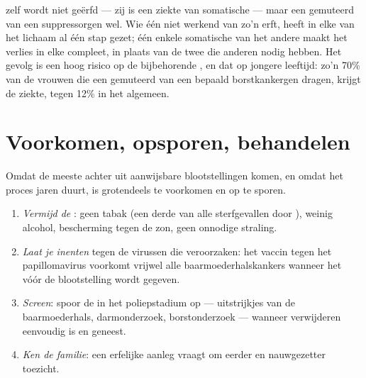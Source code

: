 \begin{proposition}\label{prop:g11:cancer:inherited}
 zelf wordt niet geërfd --- zij is een ziekte van somatische
 --- maar een gemuteerd  van een suppressorgen wel. Wie één
niet werkend  van zo'n  erft, heeft in elke  van het lichaam
al één stap gezet; één enkele somatische  van het andere 
maakt het verlies in elke  compleet, in plaats van de twee die anderen
nodig hebben. Het gevolg is een hoog risico op de bijbehorende , en
dat op jongere leeftijd: zo'n 70\% van de vrouwen die een gemuteerd 
van een bepaald borstkankergen dragen, krijgt de ziekte, tegen 12\% in het
algemeen.
\end{proposition}
\admitted

\section{Voorkomen, opsporen, behandelen}

\begin{method}\label{met:g11:cancer:prevention}
Omdat de meeste  achter  uit aanwijsbare blootstellingen
komen, en omdat het proces jaren duurt, is  grotendeels te
voorkomen en op te sporen.
\begin{enumerate}
  \item \emph{Vermijd de }: geen tabak (een derde van alle
        sterfgevallen door ), weinig alcohol, bescherming tegen de
        zon, geen onnodige straling.
  \item \emph{Laat je inenten} tegen de virussen die  veroorzaken:
        het vaccin tegen het papillomavirus voorkomt vrijwel alle
        baarmoederhalskankers wanneer het vóór de blootstelling wordt
        gegeven.
  \item \emph{Screen}: spoor de  in het poliepstadium op ---
        uitstrijkjes van de baarmoederhals, darmonderzoek,
        borstonderzoek --- wanneer verwijderen eenvoudig is en geneest.
  \item \emph{Ken de familie}: een erfelijke aanleg vraagt om eerder en
        nauwgezetter toezicht.
\end{enumerate}
\end{method}

